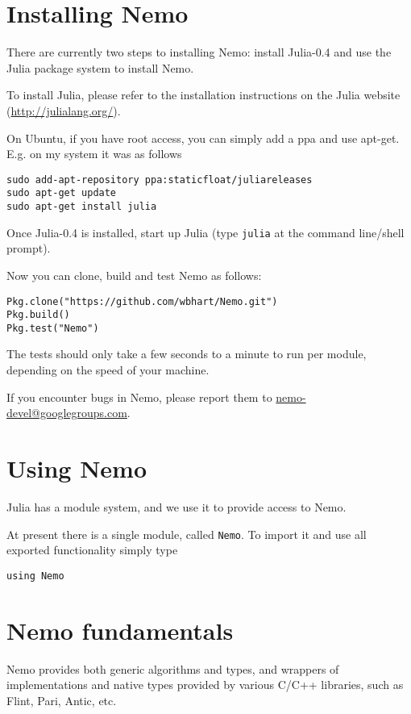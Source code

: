 \documentclass[a4paper,10pt]{article}
\newcommand{\code}{\lstinline}
\begin{document}
\section{Installing Nemo}

There are currently two steps to installing Nemo: install Julia-0.4 and use the Julia
package system to install Nemo.

To install Julia, please refer to the installation instructions on the Julia website
(\url{http://julialang.org/}).

On Ubuntu, if you have root access, you can simply add a ppa and use apt-get. E.g. on
my system it was as follows

\begin{verbatim}
sudo add-apt-repository ppa:staticfloat/juliareleases
sudo apt-get update
sudo apt-get install julia
\end{verbatim}

Once Julia-0.4 is installed, start up Julia (type \code{julia} at the command 
line/shell prompt).

Now you can clone, build and test Nemo as follows:

\begin{verbatim}
Pkg.clone("https://github.com/wbhart/Nemo.git")
Pkg.build()
Pkg.test("Nemo")
\end{verbatim}

The tests should only take a few seconds to a minute to run per module, depending on
the speed of your machine. 

If you encounter bugs in Nemo, please report them to \url{nemo-devel@googlegroups.com}.

\section{Using Nemo}

Julia has a module system, and we use it to provide access to Nemo.

At present there is a single module, called \code{Nemo}. To import it and use all
exported functionality simply type

\begin{lstlisting}
using Nemo
\end{lstlisting}

\section{Nemo fundamentals}

Nemo provides both generic algorithms and types, and wrappers of implementations and native types
provided by various C/C++ libraries, such as Flint, Pari, Antic, etc.
\end{document}
